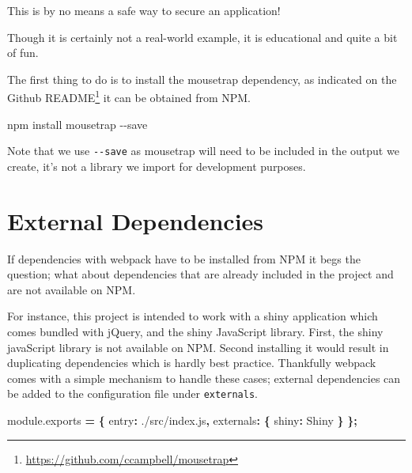 \documentclass[
]{krantz}
\makeatletter
\newenvironment{Shaded}{\begin{snugshade}}{\end{snugshade}}
\newcommand{\AttributeTok}[1]{\textcolor[rgb]{0.61,0.61,0.61}{#1}}
\newcommand{\DataTypeTok}[1]{\textcolor[rgb]{0.27,0.27,0.27}{#1}}
\newcommand{\ExtensionTok}[1]{#1}
\newcommand{\NormalTok}[1]{#1}
\newcommand{\OperatorTok}[1]{\textcolor[rgb]{0.43,0.43,0.43}{\textbf{#1}}}
\newcommand{\StringTok}[1]{\textcolor[rgb]{0.5,0.5,0.5}{#1}}
\newcommand{\VariableTok}[1]{\textcolor[rgb]{0,0,0}{#1}}
\renewcommand{\href}[2]{#2\footnote{\url{#1}}}
\newenvironment{kframe}{%
\medskip{}
\setlength{\fboxsep}{.8em}
 \def\at@end@of@kframe{}%
 \ifinner\ifhmode%
  \def\at@end@of@kframe{\end{minipage}}%
  \begin{minipage}{\columnwidth}%
 \fi\fi%
 \def\FrameCommand##1{\hskip\@totalleftmargin \hskip-\fboxsep
 \colorbox{shadecolor}{##1}\hskip-\fboxsep
     \hskip-\linewidth \hskip-\@totalleftmargin \hskip\columnwidth}%
 \MakeFramed {\advance\hsize-\width
   \@totalleftmargin\z@ \linewidth\hsize
   \@setminipage}}%
 {\par\unskip\endMakeFramed%
 \at@end@of@kframe}
\renewenvironment{Shaded}{\begin{kframe}}{\end{kframe}}
\newenvironment{rmdblock}[1]
  {
  \begin{itemize}
  \renewcommand{\labelitemi}{
    \raisebox{-.7\height}[0pt][0pt]{
      {\setkeys{Gin}{width=3em,keepaspectratio}\texttt{[image: images/\#1]}}
    }
  }
  \setlength{\fboxsep}{1em}
  \begin{kframe}
  \item
  }
  {
  \end{kframe}
  \end{itemize}
  }
\newenvironment{rmdnote}
  {\begin{rmdblock}{note}}
  {\end{rmdblock}}
\makeatother
\begin{document}
\begin{rmdnote}
This is by no means a safe way to secure an application!
\end{rmdnote}

Though it is certainly not a real-world example, it is educational and quite a bit of fun.

The first thing to do is to install the mousetrap dependency, as indicated on the \href{https://github.com/ccampbell/mousetrap}{Github README} it can be obtained from NPM.

\begin{Shaded}
\begin{Highlighting}[]
\ExtensionTok{npm}\NormalTok{ install mousetrap {-}{-}save}
\end{Highlighting}
\end{Shaded}

Note that we use \texttt{-\/-save} as mousetrap will need to be included in the output we create, it's not a library we import for development purposes.

\hypertarget{webpack-intro-external-dependencies}{%
\section{External Dependencies}\label{webpack-intro-external-dependencies}}

If dependencies with webpack have to be installed from NPM it begs the question; what about dependencies that are already included in the project and are not available on NPM.

For instance, this project is intended to work with a shiny application which comes bundled with jQuery, and the shiny JavaScript library. First, the shiny javaScript library is not available on NPM. Second installing it would result in duplicating dependencies which is hardly best practice. Thankfully webpack comes with a simple mechanism to handle these cases; external dependencies can be added to the configuration file under \texttt{externals}.

\begin{Shaded}
\begin{Highlighting}[]
\VariableTok{module}\NormalTok{.}\AttributeTok{exports} \OperatorTok{=} \OperatorTok{\{}
  \DataTypeTok{entry}\OperatorTok{:} \StringTok{\textquotesingle{}./src/index.js\textquotesingle{}}\OperatorTok{,}
  \DataTypeTok{externals}\OperatorTok{:} \OperatorTok{\{}
    \DataTypeTok{shiny}\OperatorTok{:} \StringTok{\textquotesingle{}Shiny\textquotesingle{}}
  \OperatorTok{\}}
\OperatorTok{\};}
\end{Highlighting}
\end{Shaded}
\end{document}
